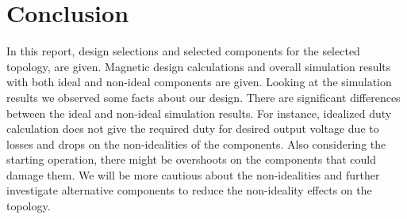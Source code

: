\section{Conclusion}
In this report, design selections and selected components for the selected topology, are given. Magnetic design calculations and overall simulation results with both ideal and non-ideal components are given. Looking at the simulation results we observed some facts about our design. There are significant differences between the ideal and non-ideal simulation results. For instance, idealized duty calculation does not give the required duty for desired output voltage due to losses and drops on the non-idealities of the components. Also considering the starting operation, there might be overshoots on the components that could damage them. We will be more cautious about the non-idealities and further investigate alternative components to reduce the non-ideality effects on the topology. 